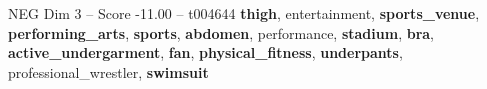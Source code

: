 \begin{textsample}{NEG Dim 3 – Score -11.00 – t004644}  \label{ex:f3_neg_037}
\textbf{thigh}, entertainment, \textbf{sports\_venue}, \textbf{performing\_arts}, \textbf{sports}, \textbf{abdomen}, performance, \textbf{stadium}, \textbf{bra}, \textbf{active\_undergarment}, \textbf{fan}, \textbf{physical\_fitness}, \textbf{underpants}, professional\_wrestler, \textbf{swimsuit}

\end{textsample}
